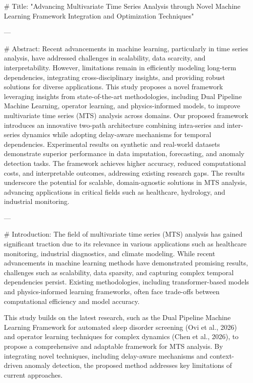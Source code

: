 # Title:
"Advancing Multivariate Time Series Analysis through Novel Machine Learning Framework Integration and Optimization Techniques"

---

# Abstract:
Recent advancements in machine learning, particularly in time series analysis, have addressed challenges in scalability, data scarcity, and interpretability. However, limitations remain in efficiently modeling long-term dependencies, integrating cross-disciplinary insights, and providing robust solutions for diverse applications. This study proposes a novel framework leveraging insights from state-of-the-art methodologies, including Dual Pipeline Machine Learning, operator learning, and physics-informed models, to improve multivariate time series (MTS) analysis across domains. Our proposed framework introduces an innovative two-path architecture combining intra-series and inter-series dynamics while adopting delay-aware mechanisms for temporal dependencies. Experimental results on synthetic and real-world datasets demonstrate superior performance in data imputation, forecasting, and anomaly detection tasks. The framework achieves higher accuracy, reduced computational costs, and interpretable outcomes, addressing existing research gaps. The results underscore the potential for scalable, domain-agnostic solutions in MTS analysis, advancing applications in critical fields such as healthcare, hydrology, and industrial monitoring.

---

# Introduction:
The field of multivariate time series (MTS) analysis has gained significant traction due to its relevance in various applications such as healthcare monitoring, industrial diagnostics, and climate modeling. While recent advancements in machine learning methods have demonstrated promising results, challenges such as scalability, data sparsity, and capturing complex temporal dependencies persist. Existing methodologies, including transformer-based models and physics-informed learning frameworks, often face trade-offs between computational efficiency and model accuracy.

This study builds on the latest research, such as the Dual Pipeline Machine Learning Framework for automated sleep disorder screening (Ovi et al., 2026) and operator learning techniques for complex dynamics (Chen et al., 2026), to propose a comprehensive and adaptable framework for MTS analysis. By integrating novel techniques, including delay-aware mechanisms and context-driven anomaly detection, the proposed method addresses key limitations of current approaches.

